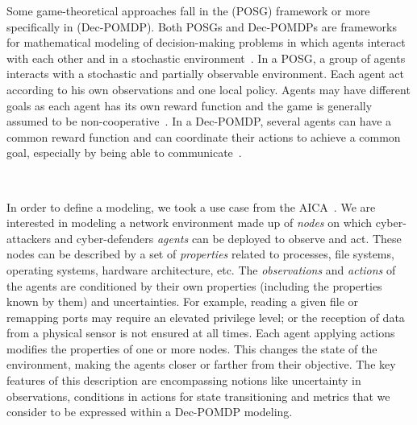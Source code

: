 \documentclass[conference]{IEEEtran}
\newcommand{\after}[1]{\textcolor{green}{#1}}
\newcommand{\rem}[1]{\textcolor{red}{#1}}
\begin{document}
\noindent
Some game-theoretical approaches fall in the  (POSG) framework or more specifically in  (Dec-POMDP). Both POSGs and Dec-POMDPs are frameworks for mathematical modeling of decision-making problems in which agents interact with each other and in a stochastic environment~\cite{beynier2010}. In a POSG, a group of agents interacts with a stochastic and partially observable environment. Each agent act according to his own observations and one local policy. Agents may have different goals as each agent has its own reward function and the game is generally assumed to be non-cooperative~\cite{jk2020}. In a Dec-POMDP, several agents can have a common reward function and can coordinate their actions to achieve a common goal, especially by being able to communicate~\cite{bernstein2013}.

\



\noindent
In order to define a modeling, we took a use case from the AICA~\cite{theron_autonomous_2021}. We are interested in modeling a network environment made up of \textit{nodes} on which cyber-attackers and cyber-defenders \textit{agents} can be deployed to observe and act. These nodes can be described by a set of \textit{properties} related to processes, file systems, operating systems, hardware architecture, etc.
The \textit{observations} and \textit{actions} of the agents are conditioned by their own properties (including the properties known by them) and uncertainties. For example, reading a given file or remapping ports may require an elevated privilege level; or the reception of data from a physical sensor is not ensured at all times.
Each agent applying actions modifies the properties of one or more nodes. This changes the state of the environment, making the agents closer or farther from their objective.
The key features of this description are encompassing notions like uncertainty in observations, conditions in actions for state transitioning and metrics that we consider to be expressed within a Dec-POMDP modeling.
\end{document}
